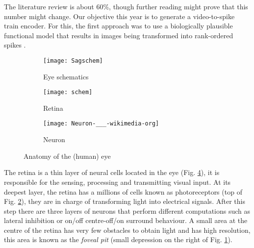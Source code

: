 The literature review is about 60\%, though further reading might prove that 
this number might change. Our objective this year is to generate a 
video-to-spike train encoder. For this, the first approach was to use a
biologically plausible functional model \cite{basab-model} that results in
images being transformed into rank-ordered spikes 
\cite{thorpe-spike-rapid-processing}.

\begin{figure}[hbt]
  \centering
  \begin{subfigure}[b]{0.15\textwidth}
    \centering
    \texttt{[image: Sagschem]}
    \caption{Eye schematics}
    \label{sub-fig-eye-schematics}
  \end{subfigure}
  \begin{subfigure}[b]{0.15\textwidth}
    \centering
    \texttt{[image: schem]}
    \caption{Retina}
    \label{sub-fig-retinal-layers}
  \end{subfigure}
  \begin{subfigure}[b]{0.15\textwidth}
    \centering
    \texttt{[image: Neuron-\_\_\_-wikimedia-org]}
    \caption{Neuron}
    \label{sub-fig-neuron}
  \end{subfigure}
  
  \caption{Anatomy of the (human) eye }
  \label{fig-basic-eye-anatomy}
\end{figure}

The retina is a thin layer of neural cells located in the eye (Fig. 
\ref{fig-basic-eye-anatomy}), it is responsible
for the sensing, processing and transmitting visual input\cite{webvision}. 
At its deepest layer, the retina has a millions of cells known as 
photoreceptors (top of Fig. \ref{sub-fig-retinal-layers}), they are in charge 
of transforming light into electrical 
signals. After this step there are three layers of neurons that 
perform different computations such as lateral inhibition or on/off 
centre-off/on surround behaviour\cite{webvision, basab-model}. A small area 
at the centre of the retina has very few obstacles to obtain light and has high
resolution, this area is known as the \emph{foveal pit} (small depression on 
the right of Fig. \ref{sub-fig-eye-schematics}).

